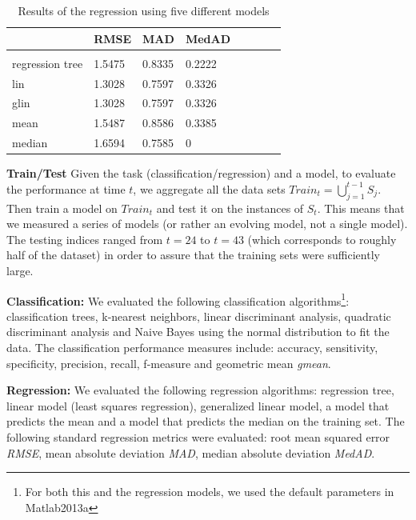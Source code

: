 \documentclass{article} %
\begin{document}
\begin{table}[h]
\caption{Results of the regression using five different models}
\label{regression}
\begin{center}
\begin{tabular}{@{}llllllll@{}}
                 & RMSE & MAD & MedAD \\
                 \hline \\
regression tree	& 1.5475    & 0.8335    & 0.2222 \\
lin             & 1.3028    & 0.7597    & 0.3326  \\
glin      & 1.3028    & 0.7597    & 0.3326 \\
mean     & 1.5487    & 0.8586    & 0.3385 \\
median     & 1.6594    & 0.7585   	& 0 \\  
\end{tabular}
\end{center}
\end{table}

\noindent\textbf{Train/Test} Given the task (classification/regression) and a model, to evaluate the performance at time $t$, we aggregate all the data sets $Train_t = \bigcup_{j=1}^{t-1}{S_j}$. Then train a model on $Train_t$ and test it on the instances of $S_t$. This means that we measured a series of models (or rather an evolving model, not a single model). The testing indices ranged from $t = 24$ to $t = 43$ (which corresponds to roughly half of the dataset) in order to assure that the training sets were sufficiently large. 

\noindent\textbf{Classification:}
We evaluated the following classification algorithms\footnote{For both this and the regression models, we used
the default parameters in Matlab2013a}: classification trees,
k-nearest neighbors, linear discriminant analysis, quadratic
discriminant analysis and Naive Bayes using the normal distribution to
fit the data.
The classification performance measures include: accuracy,
sensitivity, specificity, precision, recall, f-measure and geometric
mean \emph{gmean}. 

\noindent\textbf{Regression:} We evaluated the following regression
algorithms:%
regression tree, linear model (least squares regression), generalized
linear model, a model that predicts the mean and a model that predicts
the median on the training set.
The following standard regression metrics were evaluated: root mean
squared error \emph{RMSE}, mean absolute deviation \emph{MAD}, median
absolute deviation \emph{MedAD}.
\end{document}
